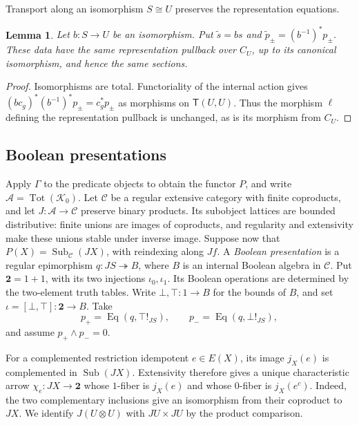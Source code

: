 \documentclass[11pt]{article}
\newtheorem{lemma}[theorem]{Lemma}
\theoremstyle{definition}
\theoremstyle{remark}
\begin{document}
Transport along an isomorphism $S\cong U$ preserves the representation equations.

\begin{lemma}\label{lem:sentence-object-transport}
Let $b:S\to U$ be an isomorphism. Put
$\widetilde s=bs$ and
$\widetilde p_\pm=(b^{-1})^*p_\pm$.
These data have the same representation pullback over $C_U$,
up to its canonical isomorphism, and hence the same sections.
\end{lemma}
\begin{proof}
Isomorphisms are total. Functoriality of the internal action gives
$(bc_g)^*(b^{-1})^*p_\pm=c_g^*p_\pm$ as morphisms on $\mathsf T(U,U)$.
Thus the morphism $\ell$ defining the representation pullback
is unchanged, as is its morphism from $C_U$.
\end{proof}

\subsection{Boolean presentations}

Apply $\Gamma$ to the predicate objects to obtain the functor $P$, and
write $\mathcal A=\operatorname{Tot}(\mathcal K_0)$.
Let $\mathcal C$ be a regular extensive category with finite
coproducts, and let $J:\mathcal A\to\mathcal C$ preserve binary
products. Its subobject lattices are bounded distributive:
finite unions are images of coproducts, and regularity and
extensivity make these unions stable under inverse image.
Suppose now that $P(X)=\operatorname{Sub}_{\mathcal C}(JX)$,
with reindexing along $Jf$. A \emph{Boolean presentation} is a regular epimorphism
$q:JS\twoheadrightarrow B$, where $B$ is an internal Boolean
algebra in $\mathcal C$. Put $\mathbf2=1+1$, with its two injections
$\iota_0,\iota_1$. Its Boolean operations are determined by the
two-element truth tables. Write $\bot,\top:1\to B$ for the bounds
of $B$, and set $\iota=[\bot,\top]:\mathbf2\to B$.
Take
\[
 p_+=\operatorname{Eq}(q,\top!_{JS}),\qquad
 p_-=\operatorname{Eq}(q,\bot!_{JS}),
\]
and assume $p_+\wedge p_-=0$.

For a complemented restriction idempotent $e\in E(X)$, its image
$j_X(e)$ is complemented in $\operatorname{Sub}(JX)$. Extensivity
therefore gives a unique characteristic arrow $\chi_e:JX\to\mathbf2$
whose $1$-fiber is $j_X(e)$ and whose $0$-fiber is $j_X(e^c)$.
Indeed, the two complementary inclusions give an isomorphism
from their coproduct to $JX$. We identify $J(U\otimes U)$ with
$JU\times JU$ by the product comparison.
\end{document}
